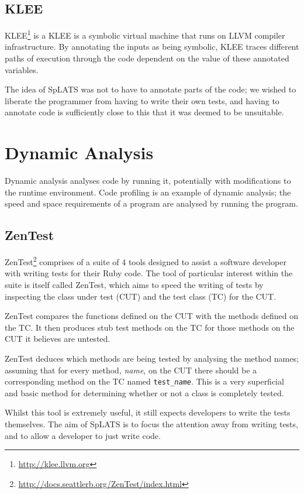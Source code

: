  \subsection{KLEE}
  KLEE\footnote{\url{http://klee.llvm.org}} is a KLEE is a symbolic virtual
  machine that runs on LLVM compiler infrastructure. By annotating the
  inputs as being symbolic, KLEE traces different paths of execution through 
  the code dependent on the value of these annotated variables.

  The idea of SpLATS was not to have to annotate parts of the code; we
  wished to liberate the programmer from having to write their own tests,
  and having to annotate code is sufficiently close to this that it was
  deemed to be unsuitable.

\section{Dynamic Analysis} 

  Dynamic analysis analyses code by running it, potentially with modifications
  to the runtime environment. Code profiling is an example of dynamic analysis;
  the speed and space requirements of a program are analysed by running the
  program.

  \subsection{ZenTest}
    ZenTest\footnote{\url{http://docs.seattlerb.org/ZenTest/index.html}}
comprises of a suite of 4 tools designed to assist a software developer with
writing tests for their Ruby code. The tool of particular interest within the suite is itself called ZenTest,
which aims to speed the writing of tests by inspecting the class under test (CUT)
and the test class (TC) for the CUT.

    ZenTest compares the functions defined on the CUT with the methods defined
on the TC. It then produces stub test methods on the TC for those methods on the
CUT it believes are untested.

ZenTest deduces which methods are being tested by analysing the method names; assuming that for every method, \emph{name}, on the CUT there should be a corresponding method on the TC named \texttt{test\_\emph{name}}. This is a very superficial and basic method for determining whether or not a class is completely tested.

    Whilst this tool is extremely useful, it still expects developers to write
the tests themselves. The aim of SpLATS is to focus the attention away from
writing tests, and to allow a developer to just write code.
  

